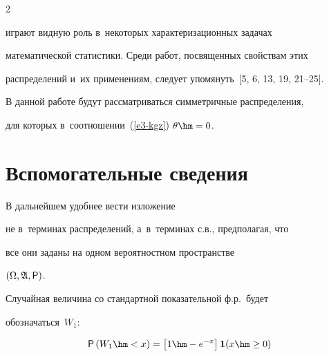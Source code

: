 \begin{multicols}{2}
\vspace*{-1pt}





\noindent


играют видную роль в~некоторых характеризационных задачах


математической статистики. Среди работ, посвященных свойствам этих


распределений и~их применениям, следует упомянуть~[5, 6, 13, 19, 21--25].





В данной работе будут рассматриваться сим\-мет\-рич\-ные распределения,


для которых в~соотношении~(\ref{e3-kgz}) $\theta\hm=0$.





\vspace*{-6pt}





\section{Вспомогательные сведения}





\vspace*{-3pt}





В дальнейшем удобнее вести изложение


не в~терминах распределений, а~в~терминах с.в., предполагая, что


все они заданы на одном вероятностном пространстве


$(\Omega,\mathfrak{A}, {\sf P})$.





Случайная величина со стандартной показательной ф.р.\ будет 


обозначаться~$W_1$: 





\noindent


$$


{\sf P}\left(W_1\hm<x\right)=\left[1\hm-e^{-x}\right]


{\bf 1}(x\hm\ge0)


$$ 



\end{multicols}
